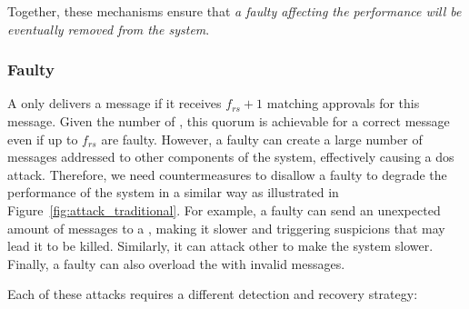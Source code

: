 Together, these mechanisms ensure that \emph{a faulty \emph{\presieve} affecting the \sieveq performance will be eventually removed from the system}.


\subsubsection{Faulty \Repsieve}
\label{faultyrepsieve}

A \postsieve only delivers a message if it receives $f_{rs}+1$ matching approvals for this message.
Given the number of \repsieves, this quorum is achievable for a correct message even if up to $f_{rs}$ \repsieves are faulty.
However, a faulty \repsieve can create a large number of messages addressed to other components of the system, effectively causing a \gls{dos} attack.
Therefore, we need countermeasures to disallow a faulty \repsieve to degrade the performance of the system in a similar way as illustrated in Figure~\ref{fig:attack_traditional}.
For example, a faulty \repsieve can send an unexpected amount of messages to a \presieve, making it slower and triggering suspicions that may lead it to be killed.
Similarly, it can attack other \repsieves to make the system slower.
Finally, a faulty \repsieve can also overload the \postsieve with invalid messages.

Each of these attacks requires a different detection and recovery strategy:

